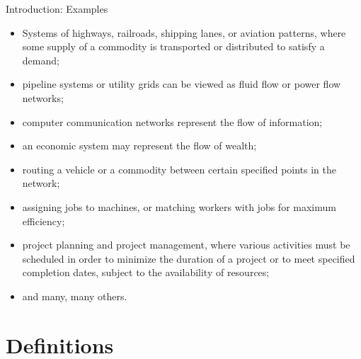 \documentclass[c]{beamer}
\begin{document}
\begin{frame}{Introduction: Examples}
\begin{itemize}
    \item Systems of highways, railroads, shipping lanes, or aviation patterns, where some supply of a commodity is transported or distributed to satisfy a demand;
    \item pipeline systems or utility grids can be viewed as fluid flow or power flow networks;
    \item computer communication networks represent the flow of information;
    \item an economic system may represent the flow of wealth;
    \item routing a vehicle or a commodity between certain specified points in the network; 
    \item assigning jobs to machines, or matching workers with jobs for maximum efficiency; 
    \item project planning and project management, where various activities must be scheduled in order to minimize the duration of a project or to meet specified completion dates, subject to the availability of resources;
    \item and many, many others.
\end{itemize}
\end{frame}

\section{Definitions}
\end{document}
